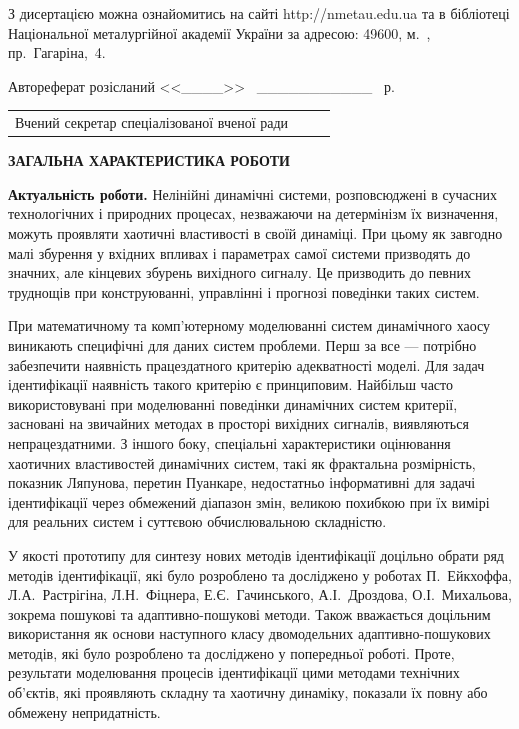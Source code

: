 \documentclass[a4paper,13pt]{atuaref}
\renewcommand{\SekrRadi}{\dissSekrRadi}
\newcommand{\xsect}[1]{\medskip\begin{center}\textbf{#1}\end{center}\medskip\penalty10000}
\begin{document}
\vspace{2ex plus 3ex}
З дисертацією можна ознайомитись на сайті http://nmetau.edu.ua
та в бібліотеці Національної металургійної
академії України за адресою: 49600, м.~\cityUa, пр.~Гагаріна,~4.

\vspace{2ex plus 3ex}
Автореферат розісланий 
<<\_\_\_\_>>
~\_\_\_\_\_\_\_\_\_\_\_
\bookyear~р.

\vspace{3ex plus 3ex}

\begin{tabular}{p{}p{}p{}}
Вчений секретар спеціалізованої вченої ради 
&
{~}
&
\SekrRadi
\end{tabular}

\vspace{1ex}

\clearpage


\setcounter{page}{1}

\xsect{ЗАГАЛЬНА ХАРАКТЕРИСТИКА РОБОТИ}

\textbf{Актуальність роботи.}
Нелінійні динамічні системи, розповсюджені в сучасних технологічних і
природних процесах, незважаючи на детермінізм їх визначення, можуть проявляти
хаотичні властивості в своїй динаміці. При цьому як завгодно малі збурення у вхідних
впливах і параметрах самої системи призводять до значних, але кінцевих збурень
вихідного сигналу. Це призводить до певних труднощів при конструюванні,
управлінні і прогнозі поведінки таких систем.

При математичному та комп'ютерному моделюванні систем динамічного хаосу
виникають специфічні для даних систем проблеми. Перш за все --- потрібно
забезпечити наявність працездатного критерію адекватності моделі. Для задач
ідентифікації наявність такого критерію є принциповим. Найбільш часто
використовувані при моделюванні поведінки динамічних систем критерії, засновані
на звичайних методах в просторі вихідних сигналів, виявляються непрацездатними. З
іншого боку, спеціальні характеристики оцінювання хаотичних властивостей динамічних
систем, такі як фрактальна розмірність, показник Ляпунова, перетин Пуанкаре,
недостатньо інформативні для задачі ідентифікації через обмежений діапазон
змін, великою похибкою при їх вимірі для реальних систем і суттєвою
обчислювальною складністю.

У якості прототипу для синтезу нових методів ідентифікації доцільно обрати ряд
методів ідентифікації, які було розроблено та досліджено у роботах
П.~Ейкхоффа, Л.А.~Растрігіна, Л.Н.~Фіцнера, Е.Є.~Гачинського,
А.І.~Дроздова, О.І.~Михальова, зокрема пошукові та адаптивно-пошукові
методи.
Також вважається доцільним використання як основи
наступного класу двомодельних адаптивно-пошукових методів,
які було розроблено та досліджено у попередньої роботі.
Проте, результати моделювання процесів ідентифікації цими методами
технічних об'єктів, які проявляють складну та хаотичну динаміку, показали
їх повну або обмежену непридатність.
\end{document}

